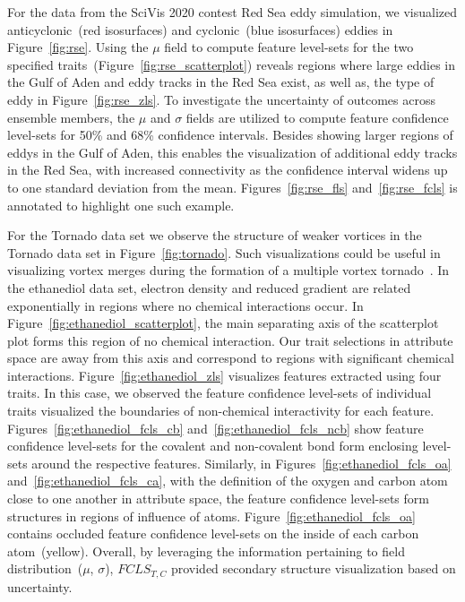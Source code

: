 For the data from the SciVis 2020 contest Red Sea eddy simulation, we visualized anticyclonic~(red isosurfaces) and cyclonic~(blue isosurfaces) eddies in Figure~\ref{fig:rse}. 
%
Using the $\mu$ field to compute feature level-sets for the two specified traits~(Figure~\ref{fig:rse_scatterplot}) reveals regions where large eddies in the Gulf of Aden and eddy tracks in the Red Sea exist, as well as, the type of eddy in Figure~\ref{fig:rse_zls}.
%
To investigate the uncertainty of outcomes across ensemble members, the $\mu$ and $\sigma$ fields are utilized to compute feature confidence level-sets for 50\% and 68\% confidence intervals.
%
Besides showing larger regions of eddys in the Gulf of Aden, this enables the visualization of additional eddy tracks in the Red Sea, with increased connectivity as the confidence interval widens up to one standard deviation from the mean. 
%
Figures~\ref{fig:rse_fls} and~\ref{fig:rse_fcls} is annotated to highlight one such example.
%

%
For the Tornado data set we observe the structure of weaker vortices in the Tornado data set in Figure~\ref{fig:tornado}.
%
Such visualizations could be useful in visualizing vortex merges during the formation of a multiple vortex tornado~\cite{atmos10100578}. 
%
In the ethanediol data set, electron density and reduced gradient are related exponentially in regions where no chemical interactions occur.
%
In Figure~\ref{fig:ethanediol_scatterplot}, the main separating axis of the scatterplot plot forms this region of no chemical interaction. 
%
Our trait selections in attribute space are away from this axis and correspond to regions with significant chemical interactions.
%
Figure~\ref{fig:ethanediol_zls} visualizes features extracted using four traits.
%
In this case, we observed the feature confidence level-sets of individual traits visualized the boundaries of non-chemical interactivity for each feature. 
%
Figures~\ref{fig:ethanediol_fcls_cb} and~\ref{fig:ethanediol_fcls_ncb} show feature confidence level-sets for the covalent and non-covalent bond form enclosing level-sets around the respective features.
%
Similarly, in Figures~\ref{fig:ethanediol_fcls_oa} and~\ref{fig:ethanediol_fcls_ca}, with the definition of the oxygen and carbon atom close to one another in attribute space, the feature confidence level-sets form structures in regions of influence of atoms.
%
Figure~\ref{fig:ethanediol_fcls_oa} contains occluded feature confidence level-sets on the inside of each carbon atom~(yellow). 
%
Overall, by leveraging the information pertaining to field distribution~(${\mu}$, ${\sigma}$), $FCLS_{T,C}$ provided secondary structure visualization based on uncertainty.
%

